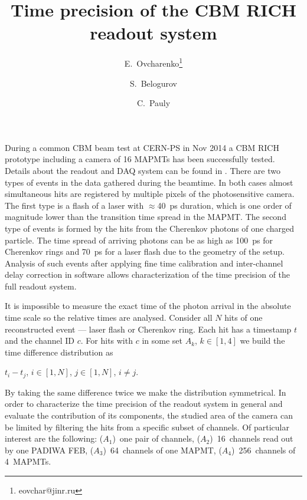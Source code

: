 \documentclass{JACoW-GSI-2015}
\begin{document}
\title{Time precision of the CBM RICH readout system}

\author[1]{E.~Ovcharenko\thanks{eovchar@jinr.ru}}
\author[1]{S.~Belogurov}
\author[2]{C.~Pauly}


\maketitle

During a common CBM beam test at CERN-PS in Nov 2014 a CBM RICH prototype including a camera of 16 MAPMTs has been successfully tested. Details about the readout and DAQ system can be found in \cite{RICH2016, PEPANL}. There are two types of events in the data gathered during the beamtime. In both cases almost simultaneous hits are registered by multiple pixels of the photosensitive camera. The first type is a flash of a laser with $\approx$40~ps duration, which is one order of magnitude lower than the transition time spread in the MAPMT. The second type of events is formed by the hits from the Cherenkov photons of one charged particle. The time spread of arriving photons can be as high as 100~ps for Cherenkov rings and 70~ps for a laser flash due to the geometry of the setup. Analysis of such events after applying fine time calibration and inter-channel delay correction in software allows characterization of the time precision of the full readout system. 

It is impossible to measure the exact time of the photon arrival in the absolute time scale so the relative times are analysed. Consider all $N$ hits of one reconstructed event --- laser flash or Cherenkov ring. Each hit has a timestamp $t$ and the channel ID $c$. For hits with $c$ in some set $A_k$, $k \in [1,4]$ we build the time difference distribution as

{\centering
$t_i-t_j$, $i \in [1,N]$, $j \in [1,N]$, $i \neq j$. \\
}

By taking the same difference twice we make the distribution symmetrical. In order to characterize the time precision of the readout system in general and evaluate the contribution of its components, the studied area of the camera can be limited by filtering the hits from a specific subset of channels. Of particular interest are the following: ($A_1$)~one pair of channels, ($A_2$)~16~channels read out by one PADIWA FEB, ($A_3$)~64~channels of one MAPMT, ($A_4$)~256~channels of 4~MAPMTs. 
\end{document}
